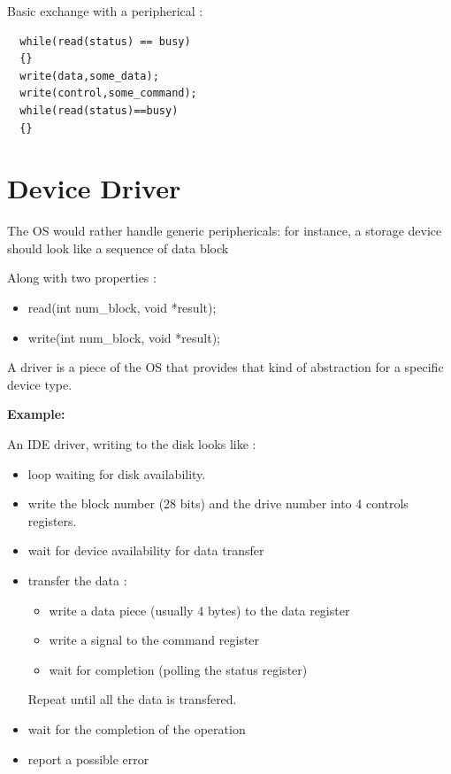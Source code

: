 \documentclass[a4paper,10pt]{article}
\begin{document}
Basic exchange with a peripherical :

\begin{verbatim}
  while(read(status) == busy) 
  {}
  write(data,some_data);
  write(control,some_command);
  while(read(status)==busy) 
  {}
\end{verbatim}



\section{Device Driver}

The OS would rather handle generic periphericals: for instance, a storage device should look like a sequence of data block


Along with two properties :
\begin{itemize}
  \item read(int num_block, void *result);
  \item write(int num_block, void *result);
\end{itemize}

A driver is a piece of the OS that provides that kind of abstraction for a specific device type.

\textbf{Example:}

An IDE driver, writing to the disk looks like :
\begin{itemize}
  \item loop waiting for disk availability.
  \item write the block number (28 bits) and the drive number into 4 controls registers.
  \item wait for device availability for data transfer
  \item transfer the data :
  \begin{itemize}
    \item write a data piece (usually 4 bytes) to the data register
    \item write a signal to the command register
    \item wait for completion (polling the status register)
  \end{itemize}
  Repeat until all the data is transfered.
  \item wait for the completion of the operation
  \item report a possible error
\end{itemize}
\end{document}
